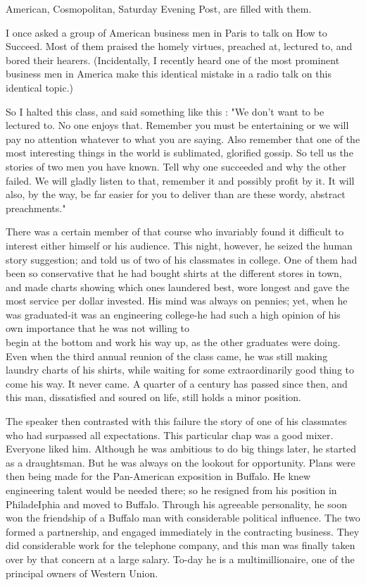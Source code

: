 \documentclass[10pt]{article}
\begin{document}
American, Cosmopolitan, Saturday Evening Post, are filled with them.

I once asked a group of American business men in Paris to talk on How to Succeed. Most of them praised the homely virtues, preached at, lectured to, and bored their hearers. (Incidentally, I recently heard one of the most prominent business men in America make this identical mistake in a radio talk on this identical topic.)

So I halted this class, and said something like this : "We don't want to be lectured to. No one enjoys that. Remember you must be entertaining or we will pay no attention whatever to what you are saying. Also remember that one of the most interesting things in the world is sublimated, glorified gossip. So tell us the stories of two men you have known. Tell why one succeeded and why the other failed. We will gladly listen to that, remember it and possibly profit by it. It will also, by the way, be far easier for you to deliver than are these wordy, abstract preachments."

There was a certain member of that course who invariably found it difficult to interest either himself or his audience. This night, however, he seized the human story suggestion; and told us of two of his classmates in college. One of them had been so conservative that he had bought shirts at the different stores in town, and made charts showing which ones laundered best, wore longest and gave the most service per dollar invested. His mind was always on pennies; yet, when he was graduated-it was an engineering college-he had such a high opinion of his own importance that he was not willing to\\
begin at the bottom and work his way up, as the other graduates were doing. Even when the third annual reunion of the class came, he was still making laundry charts of his shirts, while waiting for some extraordinarily good thing to come his way. It never came. A quarter of a century has passed since then, and this man, dissatisfied and soured on life, still holds a minor position.

The speaker then contrasted with this failure the story of one of his classmates who had surpassed all expectations. This particular chap was a good mixer. Everyone liked him. Although he was ambitious to do big things later, he started as a draughtsman. But he was always on the lookout for opportunity. Plans were then being made for the Pan-American exposition in Buffalo. He knew engineering talent would be needed there; so he resigned from his position in PhiladeIphia and moved to Buffalo. Through his agreeable personality, he soon won the friendship of a Buffalo man with considerable political influence. The two formed a partnership, and engaged immediately in the contracting business. They did considerable work for the telephone company, and this man was finally taken over by that concern at a large salary. To-day he is a multimillionaire, one of the principal owners of Western Union.
\end{document}
